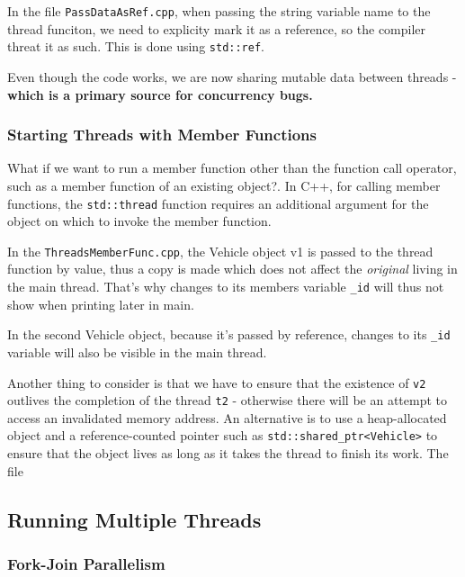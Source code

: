 \documentclass[11pt, a4paper]{article}
\begin{document}
In the file \texttt{PassDataAsRef.cpp}, when passing the string variable name to the thread funciton, we need to explicity mark it as a reference, so the compiler threat it as such. This is done using \texttt{std::ref}.


Even though the code works, we are now sharing mutable data between threads - \textbf{which is a primary source for concurrency bugs.}

\subsubsection{Starting Threads with Member Functions}%
\label{sub:starting_threads_with_member_functions}



What if we want to run a member function other than the function call operator, such as a member function of an existing object?. In C++, for calling member functions, the \texttt{std::thread} function requires an additional argument for the object on which to invoke the member function.


In the \texttt{ThreadsMemberFunc.cpp}, the Vehicle object v1 is passed to the thread function by value, thus a copy is made which does not affect the \textit{original} living in the main thread. That's why changes to its members variable \texttt{\_id} will thus not show when printing later in main. 

In the second Vehicle object, because it's passed by reference, changes to its \texttt{\_id} variable will also be visible in the main thread. 


Another thing to consider is that we have to ensure that the existence of \texttt{v2} outlives the completion of the thread \texttt{t2} - otherwise there will be an attempt to access an invalidated memory address. An alternative is to use a heap-allocated object and a reference-counted pointer such as \texttt{std::shared\_ptr<Vehicle>} to ensure that the object lives as long as it takes the thread to finish its work. The file 




\subsection{Running Multiple Threads}%
\label{sec:running_multiple_threads}


\subsubsection{Fork-Join Parallelism}%
\label{sub:fork_join_parallelism}
\end{document}
